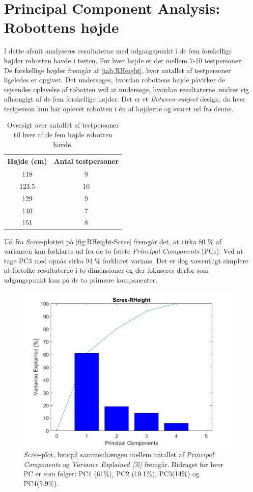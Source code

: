 \section{Principal Component Analysis: Robottens højde}
\label{DatabehandlingRHeight}
%
I dette afsnit analyseres resultaterne med udgangspunkt i de fem forskellige højder robotten havde i testen. For hver højde er der mellem 7-10 testpersoner. De forskellige højder fremgår af \autoref{tab:RHeight}, hvor antallet af testpersoner ligeledes er opgivet. Det undersøges, hvordan robottens højde påvirker de rejsendes oplevelse af robotten ved at undersøge, hvordan resultaterne ændrer sig afhængigt af de fem forskellige højder. Det er et \textit{Between-subject} design, da hver testperson kun har oplevet robotten i én af højderne og svaret ud fra denne.
%
\begin{table}[H]
\centering
\begin{tabular}{c|c}
Højde (cm) & Antal testpersoner \\ \hline
118   & 9     \\ \hline
123.5 & 10    \\ \hline
129   & 9     \\ \hline
140   & 7     \\ \hline
151   & 8      \\
\end{tabular}
\caption{Oversigt over antallet af testpersoner til hver af de fem højde robotten havde.}
\label{tab:RHeight}
\end{table}
\noindent
%
Ud fra \textit{Scree}-plottet på \autoref{fig:RHeight-Scree} fremgår det, at cirka 80 \% af variansen kan forklares ud fra de to første \textit{Principal Components} (PCs). Ved at tage PC3 med opnås cirka 94 \% forklaret varians. Det er dog væsentligt simplere at fortolke resultaterne i to dimensioner og der fokuseres derfor som udgangspunkt kun på de to primære komponenter.
%
\begin{figure}[H]
\centering
\includegraphics[width=\textwidth]{Figure/DatabehandlingSkalaer/PCAfigures/RHeight-Scree.png}
\caption{\textit{Scree}-plot, hvorpå sammenhængen mellem antallet af \textit{Principal Components} og \textit{Variance Explained [\%]} fremgår. Bidraget for hver PC er som følger: PC1 (61\%), PC2 (19.1\%), PC3(14\%) og PC4(5.9\%).}
\label{fig:RHeight-Scree}
\end{figure}
